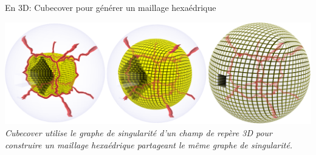 \begin{frame}{En 3D: Cubecover pour générer un maillage hexaédrique}
    \begin{center}
        \includegraphics[width=\linewidth]{img/cubecover/B34_graphe_interieur.PNG}
        \small{
            \textit{Cubecover utilise le graphe de singularité d'un champ de repère 3D pour construire un maillage hexaédrique partageant le même graphe de singularité.}
        }
    \end{center}
\end{frame}
